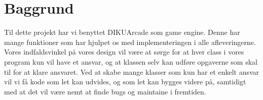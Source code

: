 \section{Baggrund}
Til dette projekt har vi benyttet DIKUArcade som game engine. Denne har mange funktioner som har hjulpet os med implementeringen i alle afleveringerne. Vores indfaldsvinkel på vores design vil være at sørge for at hver class i vores program kun vil have et ansvar, og at klassen selv kan udføre opgaverne som skal til for at klare ansvaret. Ved at skabe mange klasser som kun har et enkelt ansvar vil vi få kode som let kan udvides, og som let kan bygges videre på, samtidigt med at det vil være nemt at finde bugs og maintaine i fremtiden. 
